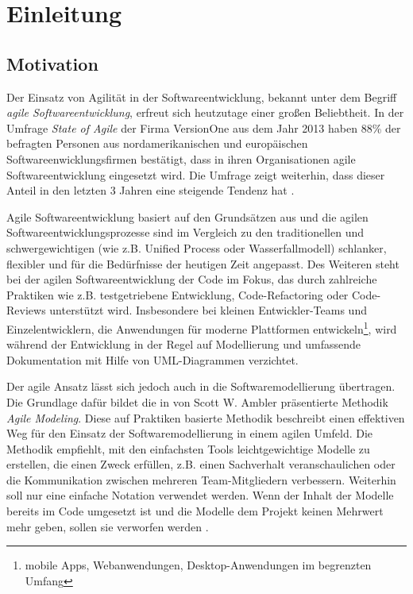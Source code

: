 
\chapter{Einleitung}

\section{Motivation}

Der Einsatz von Agilität in der Softwareentwicklung, bekannt unter dem Begriff \textit{agile Softwareentwicklung}, erfreut sich heutzutage einer großen Beliebtheit. In der Umfrage \textit{State of Agile} der Firma VersionOne aus dem Jahr 2013 haben 88\% der befragten Personen aus nordamerikanischen und europäischen Softwareenwicklungsfirmen bestätigt, dass in ihren Organisationen agile Softwareentwicklung eingesetzt wird. Die Umfrage zeigt weiterhin, dass dieser Anteil in den letzten 3 Jahren eine steigende Tendenz hat \cite{VersionOne148th-Annual}.

Agile Softwareentwicklung basiert auf den Grundsätzen aus \cite{BeckBeedle01Manifest} und die agilen Softwareentwicklungsprozesse sind im Vergleich zu den traditionellen und schwergewichtigen (wie z.B. Unified Process oder Wasserfallmodell) schlanker, flexibler und für die Bedürfnisse der heutigen Zeit angepasst. Des Weiteren steht bei der agilen Softwareentwicklung der Code im Fokus, das durch zahlreiche Praktiken wie z.B. testgetriebene Entwicklung, Code-Refactoring oder Code-Reviews unterstützt wird. Insbesondere bei kleinen Entwickler-Teams und Einzelentwicklern, die Anwendungen für moderne Plattformen entwickeln\footnote{mobile Apps, Webanwendungen, Desktop-Anwendungen im begrenzten Umfang}, wird während der Entwicklung in der Regel auf Modellierung und umfassende Dokumentation mit Hilfe von UML-Diagrammen verzichtet.

Der agile Ansatz lässt sich jedoch auch in die Softwaremodellierung übertragen. Die Grundlage dafür bildet die in \cite{Ambler02Agile} von Scott W. Ambler präsentierte Methodik \textit{Agile Modeling}. Diese auf Praktiken basierte Methodik beschreibt einen effektiven Weg für den Einsatz der Softwaremodellierung in einem agilen Umfeld. Die Methodik empfiehlt, mit den einfachsten Tools leichtgewichtige Modelle zu erstellen, die einen Zweck erfüllen, z.B. einen Sachverhalt  veranschaulichen oder die Kommunikation zwischen mehreren Team-Mitgliedern verbessern. Weiterhin soll nur eine einfache Notation verwendet werden. Wenn der Inhalt der Modelle bereits im Code umgesetzt ist und die Modelle dem Projekt keinen Mehrwert mehr geben, sollen sie verworfen werden \cite{Ambler02Agile}.



